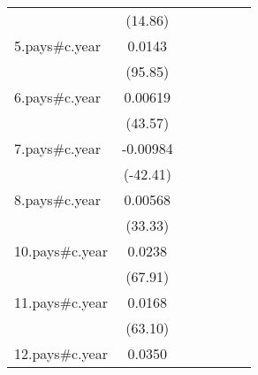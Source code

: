 {\begin{tabular}{l*{6}{c}}
                    &     (14.86)         &                     &                     &                     &                     &                     \\
[1em]
5.pays#c.year       &      0.0143\sym{***}&                     &                     &                     &                     &                     \\
                    &     (95.85)         &                     &                     &                     &                     &                     \\
[1em]
6.pays#c.year       &     0.00619\sym{***}&                     &                     &                     &                     &                     \\
                    &     (43.57)         &                     &                     &                     &                     &                     \\
[1em]
7.pays#c.year       &    -0.00984\sym{***}&                     &                     &                     &                     &                     \\
                    &    (-42.41)         &                     &                     &                     &                     &                     \\
[1em]
8.pays#c.year       &     0.00568\sym{***}&                     &                     &                     &                     &                     \\
                    &     (33.33)         &                     &                     &                     &                     &                     \\
[1em]
10.pays#c.year      &      0.0238\sym{***}&                     &                     &                     &                     &                     \\
                    &     (67.91)         &                     &                     &                     &                     &                     \\
[1em]
11.pays#c.year      &      0.0168\sym{***}&                     &                     &                     &                     &                     \\
                    &     (63.10)         &                     &                     &                     &                     &                     \\
[1em]
12.pays#c.year      &      0.0350\sym{***}&                     &                     &                     &                     &                     \\

\end{tabular}}
